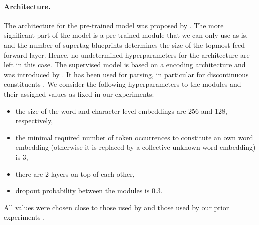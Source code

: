 \documentclass[../../document.tex]{subfiles}
\begin{document}
    \paragraph*{Architecture.}
    The architecture for the pre-trained model was proposed by \citet{Devlin2019}.
    The more significant part of the model is a pre-trained module that we can only use as is, and the number of supertag blueprints determines the size of the topmost feed-forward layer.
    Hence, no undetermined hyperparameters for the architecture are left in this case.
    The  supervised model is based on a  encoding architecture and was introduced by \citet{kiperwasser2016simple}.
    It has been used for parsing, in particular for discontinuous constituents \citep{kiperwasser2016simple,CoaCoh19,StaSte20,Cor20}.
    We consider the following hyperparameters to the modules and their assigned values as fixed in our experiments:
    \begin{itemize}
        \item the size of the word and character-level embeddings are 256 and 128, respectively,
        \item the minimal required number of token occurrences to constitute an own word embedding (otherwise it is replaced by a collective unknown word embedding) is 3,
        \item there are 2  layers on top of each other,
        \item dropout probability between the modules is 0.3.
    \end{itemize}
    All values were chosen close to those used by \citet{Cor20} and those used by our prior experiments \citep{Rup22}.
\end{document}
